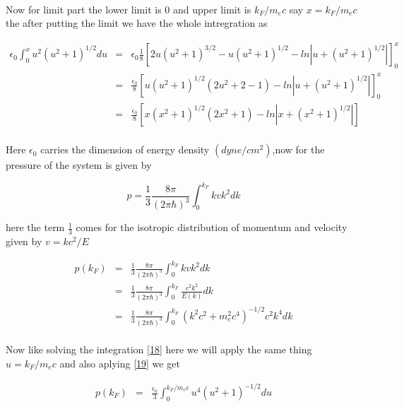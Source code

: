 \documentclass{report}
\begin{document}
\paragraph{ }
Now for limit part the lower limit is 0 and upper limit is $k_F/m_e c$ say $x=k_F/m_e c$ the after putting the limit we have the whole intregration as 
\begin{center}
\begin{eqnarray}
\epsilon_0\int_0 ^x u^2(u^2+1)^{1/2}du &=& \epsilon_0 \frac{1}{8}\left[ 2u(u^2+1)^{3/2} -u(u^2+1)^{1/2} -ln| u +(u^2+1)^{1/2}| \right]_0 ^x \nonumber \\
	&=& \frac{\epsilon_0}{8}\left[ u(u^2+1)^{1/2}(2u^2+2-1) -ln| u +(u^2+1)^{1/2}| \right]_0 ^x \nonumber \\
	&=& \frac{\epsilon_0}{8}\left[ x(x^2+1)^{1/2}(2x^2+1) -ln| x +(x^2+1)^{1/2}| \right] 
\label{20}
\end{eqnarray}
\end{center}
\newpage
\paragraph{ }
Here $\epsilon_0$ carries the dimension of energy density $(dyne/cm^2)$,now for the pressure of the system is given by 
\begin{center}
\begin{equation}
p =\frac{1}{3}\frac{8\pi}{(2\pi\hbar)^3}\int_0 ^{k_F} kvk^2 dk
\label{21}
\end{equation}
\end{center}
here the term $\frac{1}{3}$ comes for the isotropic distribution of momentum and velocity given by $v= kc^2/E$
\begin{center}
\begin{eqnarray}
p(k_F)&=& \frac{1}{3}\frac{8\pi}{(2\pi\hbar)^3}\int_0 ^{k_F} kvk^2 dk \nonumber \\
	&=& \frac{1}{3}\frac{8\pi}{(2\pi\hbar)^3}\int_0 ^{k_F} \frac{c^2k^2}{E(k)} dk \nonumber \\
	&=& \frac{1}{3}\frac{8\pi}{(2\pi\hbar)^3}\int_0 ^{k_F} (k^2 c^2 +m_e ^2 c^4)^{-1/2}c^2 k^4 dk \nonumber 
\end{eqnarray}
\end{center}
\paragraph{ }
Now like solving the integration \ref{18} here we will apply the same thing $u =k_F/m_ec$ and also aplying \ref{19} we get 
\begin{center}
\begin{eqnarray}
p(k_F) &=& \frac{\epsilon_0}{3} \int_0 ^{k_F/m_e c}u^4(u^2+1)^{-1/2}du  \nonumber
\end{eqnarray}
\end{center}
\end{document}
